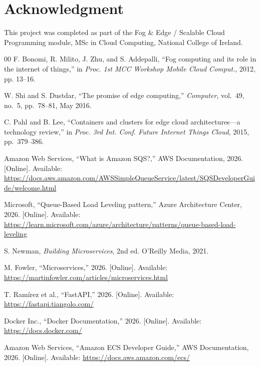 \documentclass[conference]{IEEEtran}
\begin{document}
\section*{Acknowledgment}
This project was completed as part of the Fog \& Edge / Scalable Cloud Programming module, MSc in Cloud Computing, National College of Ireland.

\begin{thebibliography}{00}
F. Bonomi, R. Milito, J. Zhu, and S. Addepalli, ``Fog computing and its role in the internet of things,'' in \emph{Proc. 1st MCC Workshop Mobile Cloud Comput.}, 2012, pp. 13--16.

W. Shi and S. Dustdar, ``The promise of edge computing,'' \emph{Computer}, vol.~49, no.~5, pp.~78--81, May 2016.

C. Pahl and B. Lee, ``Containers and clusters for edge cloud architectures---a technology review,'' in \emph{Proc. 3rd Int. Conf. Future Internet Things Cloud}, 2015, pp.~379--386.

Amazon Web Services, ``What is Amazon SQS?,'' AWS Documentation, 2026. [Online]. Available: \url{https://docs.aws.amazon.com/AWSSimpleQueueService/latest/SQSDeveloperGuide/welcome.html}

Microsoft, ``Queue-Based Load Leveling pattern,'' Azure Architecture Center, 2026. [Online]. Available: \url{https://learn.microsoft.com/azure/architecture/patterns/queue-based-load-leveling}

S. Newman, \emph{Building Microservices}, 2nd ed. O'Reilly Media, 2021.

M. Fowler, ``Microservices,'' 2026. [Online]. Available: \url{https://martinfowler.com/articles/microservices.html}

T. Ram\'irez et al., ``FastAPI,'' 2026. [Online]. Available: \url{https://fastapi.tiangolo.com/}

Docker Inc., ``Docker Documentation,'' 2026. [Online]. Available: \url{https://docs.docker.com/}

Amazon Web Services, ``Amazon ECS Developer Guide,'' AWS Documentation, 2026. [Online]. Available: \url{https://docs.aws.amazon.com/ecs/}
\end{thebibliography}
\end{document}
